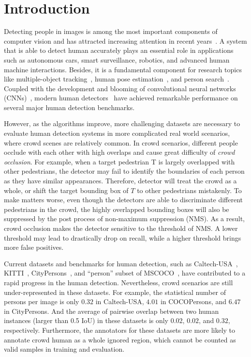 \documentclass[10pt,twocolumn,letterpaper]{article}
\begin{document}
\section{Introduction}
Detecting people in images is among the most important components of computer vision and has attracted increasing attention in recent years~\cite{zhang2016faster,li2015scale,zhang2015filtered,zhang2016far,hosang2015taking,dollar2009integral,dollar2014fast,dollar2009pedestrian,mao2017can}. 
A system that is able to detect human accurately plays an essential role in applications such as autonomous cars, smart surveillance, robotics, and advanced human machine interactions. Besides, it is a fundamental component for research topics like multiple-object tracking~\cite{mot2015}, human pose estimation~\cite{yilun2018cpn}, and person search~\cite{xiaotong2017cvpr}. Coupled with the development and blooming of convolutional neural networks (CNNs)~\cite{krizhevsky2012imagenet,simonyan2014very,he2016deep}, modern human detectors~\cite{cai2016unified,zhang2016faster,wang2018Repulsion} have achieved remarkable performance on several major human detection benchmarks. 

However, as the algorithms improve, more challenging datasets are necessary to evaluate human detection systems in more complicated real world scenarios, where crowd scenes are relatively common. In crowd scenarios, different people occlude with each other with high overlaps and cause great difficulty of \emph{crowd occlusion}. For example, when a target pedestrian T is largely overlapped with other pedestrians,  the detector may fail to identify the boundaries of each person as they have similar appearances. Therefore,  detector will treat the crowd as a whole, or shift the target bounding box of $T$ to other pedestrians mistakenly. To make matters worse, even though the detectors are able to discriminate different pedestrians in the crowd, the highly overlapped bounding boxes will also be suppressed by the post process of non-maximum suppression (NMS). As a result,  crowd occlusion makes the detector sensitive to the threshold of NMS. A lower threshold may lead to drastically drop on recall, while a higher threshold brings more false positives.




Current datasets and benchmarks for human detection, such as Caltech-USA~\cite{dollar2009pedestrian}, KITTI~\cite{Geiger2012CVPR}, CityPersons~\cite{zhang2017citypersons}, and ``person'' subset of MSCOCO~\cite{lin2014microsoft}, have contributed to a rapid progress in the human detection. Nevertheless, crowd scenarios are still under-represented in these datasets. For example, the statistical number of persons per image is only $0.32$ in Caltech-USA, $4.01$ in COCOPersons, and $6.47$ in CityPersons.  And the average of pairwise overlap between two human instances (larger than 0.5 IoU) in these datasets is only $0.02$, $0.02$, and $0.32$, respectively. Furthermore, the annotators for these datasets are more likely to annotate crowd human as a whole ignored region, which cannot be counted as valid samples in training and evaluation.
\end{document}
